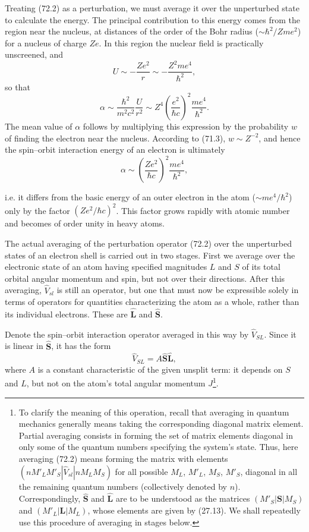 Treating (72.2) as a perturbation, we must average it over the unperturbed state to calculate the energy. The principal contribution to this energy comes from the region near the nucleus, at distances of the order of the Bohr radius ($\sim\hbar^2/Zme^2$) for a nucleus of charge $Ze$. In this region the nuclear field is practically unscreened, and
\[
 U\sim-\frac{Ze^2}{r}\sim-\frac{Z^2me^4}{\hbar^2},
\]
so that
\[
 \alpha\sim\frac{\hbar^2}{m^2c^2}\frac U{r^2}\sim Z^4\left(\frac{e^2}{\hbar c}\right)^2\frac{me^4}{\hbar^2}.
\]
The mean value of $\alpha$ follows by multiplying this expression by the probability $w$ of finding the electron near the nucleus. According to (71.3), $w\sim Z^{-2}$, and hence the spin--orbit interaction energy of an electron is ultimately
\[
 \alpha\sim\left(\frac{Ze^2}{\hbar c}\right)^2\frac{me^4}{\hbar^2},
\]

i.e. it differs from the basic energy of an outer electron in the atom ($\sim me^4/\hbar^2$) only by the factor $(Ze^2/\hbar c)^2$. This factor grows rapidly with atomic number and becomes of order unity in heavy atoms.

The actual averaging of the perturbation operator (72.2) over the unperturbed states of an electron shell is carried out in two stages. First we average over the electronic state of an atom having specified magnitudes $L$ and $S$ of its total orbital angular momentum and spin, but not over their directions. After this averaging, $\hat V_{sl}$ is still an operator, but one that must now be expressible solely in terms of operators for quantities characterizing the atom as a whole, rather than its individual electrons. These are $\hat{\mathbf L}$ and $\hat{\mathbf S}$.

Denote the spin--orbit interaction operator averaged in this way by $\hat V_{SL}$. Since it is linear in $\hat{\mathbf S}$, it has the form
\begin{equation}
 \hat V_{SL}=A\hat{\mathbf S}\hat{\mathbf L},
 \tag{72.4}
\end{equation}
where $A$ is a constant characteristic of the given unsplit term: it depends on $S$ and $L$, but not on the atom's total angular momentum $J$\footnote{To clarify the meaning of this operation, recall that averaging in quantum mechanics generally means taking the corresponding diagonal matrix element. Partial averaging consists in forming the set of matrix elements diagonal in only some of the quantum numbers specifying the system's state. Thus, here averaging (72.2) means forming the matrix with elements $(nM'_LM'_S|\hat V_{sl}|nM_LM_S)$ for all possible $M_L$, $M'_L$, $M_S$, $M'_S$, diagonal in all the remaining quantum numbers (collectively denoted by $n$). Correspondingly, $\hat{\mathbf S}$ and $\hat{\mathbf L}$ are to be understood as the matrices $(M'_S|\mathbf S|M_S)$ and $(M'_L|\mathbf L|M_L)$, whose elements are given by (27.13). We shall repeatedly use this procedure of averaging in stages below.}.

